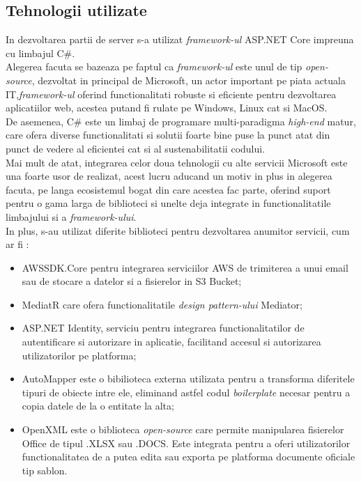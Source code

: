 \subsection*{Tehnologii utilizate}
In dezvoltarea partii de server s-a utilizat \textit{framework-ul } ASP.NET Core impreuna cu limbajul C\#.\\
Alegerea facuta se bazeaza pe faptul ca \textit{framework-ul} este unul de tip \textit{open-source}, dezvoltat in principal de Microsoft, un actor important pe piata actuala IT,\textit{framework-ul} oferind functionalitati robuste si eficiente pentru dezvoltarea aplicatiilor web, acestea putand fi rulate pe Windows, Linux cat si MacOS.\\
De asemenea, C\# este un limbaj de programare multi-paradigma \textit{high-end} matur, care ofera diverse functionalitati si solutii foarte bine puse la punct atat din punct de vedere al eficientei cat si al sustenabilitatii codului.\\
Mai mult de atat, integrarea celor doua tehnologii cu alte servicii Microsoft este una foarte usor de realizat, acest lucru aducand un motiv in plus in alegerea facuta, pe langa ecosistemul bogat din care acestea fac parte, oferind suport pentru o gama larga de biblioteci si unelte deja integrate in functionalitatile limbajului si a \textit{framework-ului}.\\
In plus, s-au utilizat diferite biblioteci pentru dezvoltarea anumitor servicii, cum ar fi :
\begin{itemize}
	\item  AWSSDK.Core pentru integrarea serviciilor AWS de trimiterea a unui email sau de stocare a datelor si a fisierelor in S3 Bucket;
	
	\item  MediatR care ofera functionalitatile \textit{design pattern-ului} Mediator;
	
	\item ASP.NET Identity, serviciu pentru integrarea functionalitatilor de autentificare si autorizare in aplicatie, facilitand accesul si autorizarea utilizatorilor pe platforma;
	
	
	\item AutoMapper este o bibilioteca externa utilizata pentru a transforma diferitele tipuri de obiecte intre ele, eliminand astfel codul \textit{boilerplate} necesar pentru a copia datele de la  o entitate la alta;
	
	\item OpenXML este o biblioteca \textit{open-source} care permite manipularea fisierelor Office de tipul .XLSX sau .DOCS. Este integrata pentru a oferi utilizatorilor functionalitatea de a putea edita sau exporta pe platforma documente oficiale tip sablon.
	
\end{itemize}
   

